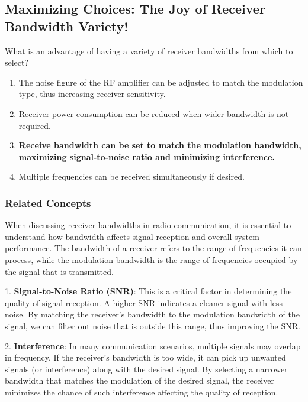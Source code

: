 \subsection{Maximizing Choices: The Joy of Receiver Bandwidth Variety!}

\begin{tcolorbox}[colback=gray!10, colframe=black, title=E4C10] What is an advantage of having a variety of receiver bandwidths from which to select?
\begin{enumerate}[label=\Alph*.]
    \item The noise figure of the RF amplifier can be adjusted to match the modulation type, thus increasing receiver sensitivity.
    \item Receiver power consumption can be reduced when wider bandwidth is not required.
    \item \textbf{Receive bandwidth can be set to match the modulation bandwidth, maximizing signal-to-noise ratio and minimizing interference.}
    \item Multiple frequencies can be received simultaneously if desired.
\end{enumerate} \end{tcolorbox}

\subsubsection*{Related Concepts}

When discussing receiver bandwidths in radio communication, it is essential to understand how bandwidth affects signal reception and overall system performance. The bandwidth of a receiver refers to the range of frequencies it can process, while the modulation bandwidth is the range of frequencies occupied by the signal that is transmitted.

1. \textbf{Signal-to-Noise Ratio (SNR)}: This is a critical factor in determining the quality of signal reception. A higher SNR indicates a cleaner signal with less noise. By matching the receiver's bandwidth to the modulation bandwidth of the signal, we can filter out noise that is outside this range, thus improving the SNR.

2. \textbf{Interference}: In many communication scenarios, multiple signals may overlap in frequency. If the receiver's bandwidth is too wide, it can pick up unwanted signals (or interference) along with the desired signal. By selecting a narrower bandwidth that matches the modulation of the desired signal, the receiver minimizes the chance of such interference affecting the quality of reception.


